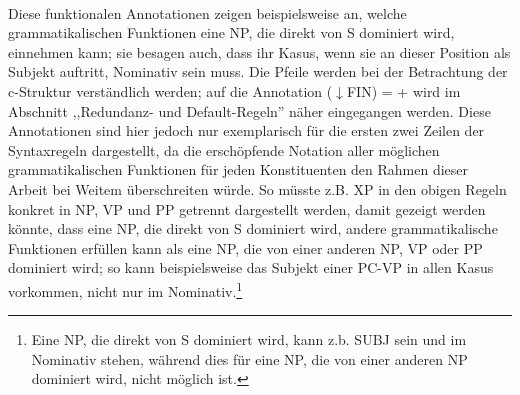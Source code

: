 \documentclass[12pt,a4paper]{article}
\begin{document}
\begin{singlespace}
\begin{tabular}{ l  l  c  c  c  c  c  c  c}
\end{tabular}\\
\newline
\end{singlespace}

Diese funktionalen Annotationen zeigen beispielsweise an, welche grammatikalischen Funktionen eine NP, die direkt von S dominiert wird, einnehmen kann; sie besagen auch, dass ihr Kasus, wenn sie an dieser Position als Subjekt auftritt, Nominativ sein muss. Die Pfeile werden bei der Betrachtung der c-Struktur verständlich werden; auf die Annotation ($\downarrow$FIN) = + wird im Abschnitt ,,Redundanz- und Default-Regeln'' näher eingegangen werden. Diese Annotationen sind hier jedoch nur exemplarisch für die ersten zwei Zeilen der Syntaxregeln dargestellt, da die erschöpfende Notation aller möglichen grammatikalischen Funktionen für jeden Konstituenten den Rahmen dieser Arbeit bei Weitem überschreiten würde. So müsste z.B. XP in den obigen Regeln konkret in NP, VP und PP getrennt dargestellt werden, damit gezeigt werden könnte, dass eine NP, die direkt von S dominiert wird, andere grammatikalische Funktionen erfüllen kann als eine NP, die von einer anderen NP, VP oder PP dominiert wird; so kann beispielsweise das Subjekt einer PC-VP in allen Kasus vorkommen, nicht nur im Nominativ.\footnote{Eine NP, die direkt von S dominiert wird, kann z.b. SUBJ sein und im Nominativ stehen, während dies für eine NP, die von einer anderen NP dominiert wird, nicht möglich ist.}
\end{document}
